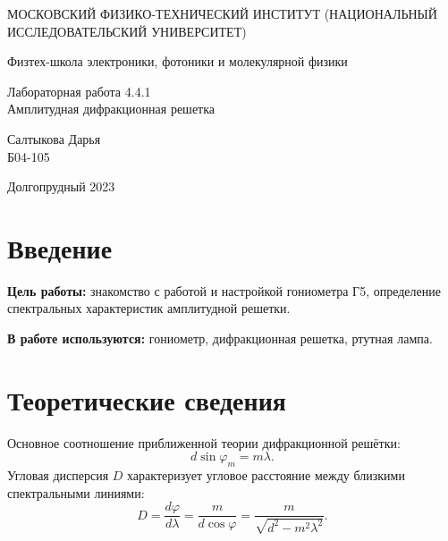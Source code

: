 \documentclass[a4paper,12pt]{article} %
\begin{document}
	
	\begin{titlepage}
	\begin{center}
		{\large МОСКОВСКИЙ ФИЗИКО-ТЕХНИЧЕСКИЙ ИНСТИТУТ (НАЦИОНАЛЬНЫЙ ИССЛЕДОВАТЕЛЬСКИЙ УНИВЕРСИТЕТ)}
	\end{center}
	\begin{center}
		{\large Физтех-школа электроники, фотоники и молекулярной физики}
	\end{center}
	
	
	\vspace{4.5cm}
	{\huge
		\begin{center}
			{Лабораторная работа 4.4.1}\\
			Амплитудная дифракционная решетка
		\end{center}
	}
	\vspace{2cm}
	\begin{flushright}
		{\LARGE Салтыкова Дарья \\
			\vspace{0.5cm}
			Б04-105}
	\end{flushright}
	\vspace{8cm}
	\begin{center}
		Долгопрудный 2023
	\end{center}
\end{titlepage}

\section{Введение}

\noindent
\textbf{Цель работы:} знакомство с работой и настройкой гониометра Г5, определение спектральных характеристик амплитудной решетки.
\medskip

\noindent \textbf{В работе используются:} гониометр, дифракционная решетка, ртутная лампа.

\medskip

\section{Теоретические сведения}

\noindent Основное соотношение приближенной теории дифракционной решётки:
	\begin{equation}
	d\sin \varphi_m = m\lambda.
	\end{equation}
	Угловая дисперсия $D$ характеризует угловое расстояние между близкими спектральными линиями:
	\begin{equation}
	D = \frac{d\varphi}{d\lambda} = \frac{m}{d \cos \varphi}=\frac{m}{\sqrt{d^{2}-m^{2} \lambda^{2}}}.
	\end{equation}
\end{document}
